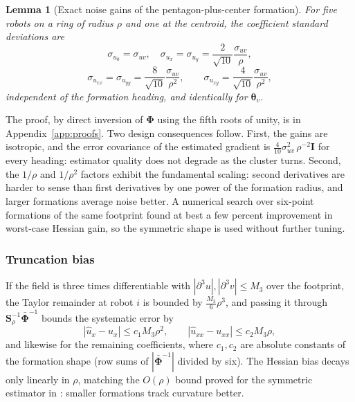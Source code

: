 \documentclass[lettersize,journal]{IEEEtran}
\newtheorem{lemma}{Lemma}
\begin{document}
\begin{lemma}[Exact noise gains of the pentagon-plus-center formation]
\label{lem:gains}
For five robots on a ring of radius $\rho$ and one at the centroid, the
coefficient standard deviations are
\begin{equation}
    \sigma_{u_0} = \sigma_{uv}, \quad
    \sigma_{u_x} = \sigma_{u_y} = \frac{2}{\sqrt{10}}\frac{\sigma_{uv}}{\rho},
    \label{eq:gain_grad}
\end{equation}
\begin{equation}
    \sigma_{u_{xx}} = \sigma_{u_{yy}} = \frac{8}{\sqrt{10}}
    \frac{\sigma_{uv}}{\rho^2},
    \qquad
    \sigma_{u_{xy}} = \frac{4}{\sqrt{10}}\frac{\sigma_{uv}}{\rho^2},
    \label{eq:gain_hess}
\end{equation}
independent of the formation heading, and identically for
$\boldsymbol{\theta}_v$.
\end{lemma}

The proof, by direct inversion of $\boldsymbol{\Phi}$ using the fifth
roots of unity, is in Appendix~\ref{app:proofs}. Two design
consequences follow. First, the gains are isotropic, and the error
covariance of the estimated gradient is
$\tfrac{4}{10}\sigma_{uv}^2\,\rho^{-2}\mathbf{I}$ for every heading:
estimator quality does not degrade as the cluster turns. Second, the
$1/\rho$ and $1/\rho^2$ factors exhibit the fundamental scaling: second
derivatives are harder to sense than first derivatives by one power of
the formation radius, and larger formations average noise better. A
numerical search over six-point formations of the same footprint found
at best a few percent improvement in worst-case Hessian gain, so the
symmetric shape is used without further tuning.

\subsubsection{Truncation bias}
If the field is three times differentiable with
$|\partial^3 u|, |\partial^3 v| \leq M_3$ over the footprint, the Taylor
remainder at robot $i$ is bounded by $\tfrac{M_3}{6}\rho^3$, and passing
it through $\mathbf{S}_\rho^{-1}\bar{\boldsymbol{\Phi}}^{-1}$ bounds the
systematic error by
\begin{equation}
    |\hat{u}_x - u_x| \leq c_1 M_3 \rho^2, \qquad
    |\hat{u}_{xx} - u_{xx}| \leq c_2 M_3 \rho,
    \label{eq:truncation}
\end{equation}
and likewise for the remaining coefficients, where $c_1, c_2$ are
absolute constants of the formation shape (row sums of
$|\bar{\boldsymbol{\Phi}}^{-1}|$ divided by six). The Hessian bias decays
only linearly in $\rho$, matching the $O(\rho)$ bound proved for the
symmetric estimator in \cite{15}: smaller formations track curvature better.
\end{document}
